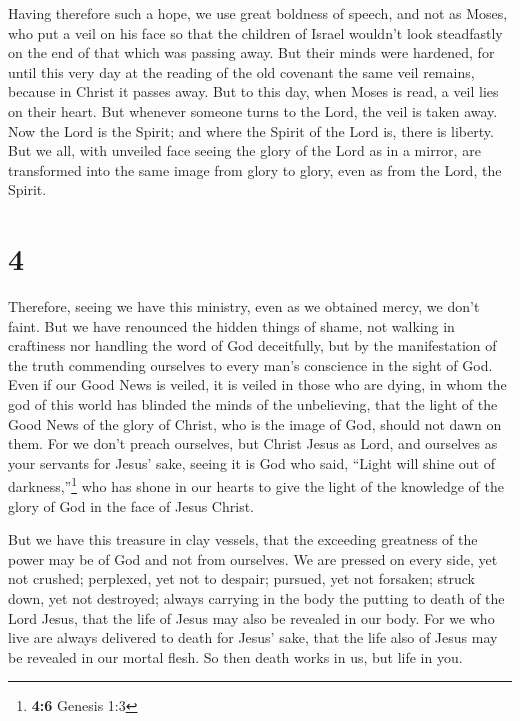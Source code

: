  Having therefore such a hope, we use great boldness of
speech,  and not as Moses, who put a veil on his face so
that the children of Israel wouldn't look steadfastly on the end of that
which was passing away.  But their minds were hardened,
for until this very day at the reading of the old covenant the same veil
remains, because in Christ it passes away.  But to this
day, when Moses is read, a veil lies on their heart.  But
whenever someone turns to the Lord, the veil is taken away.
 Now the Lord is the Spirit; and where the Spirit of the
Lord is, there is liberty.  But we all, with unveiled
face seeing the glory of the Lord as in a mirror, are transformed into
the same image from glory to glory, even as from the Lord, the Spirit.

\hypertarget{section-3}{%
\section{4}\label{section-3}}

 Therefore, seeing we have this ministry, even as we
obtained mercy, we don't faint.  But we have renounced the
hidden things of shame, not walking in craftiness nor handling the word
of God deceitfully, but by the manifestation of the truth commending
ourselves to every man's conscience in the sight of God. 
Even if our Good News is veiled, it is veiled in those who are dying,
 in whom the god of this world has blinded the minds of
the unbelieving, that the light of the Good News of the glory of Christ,
who is the image of God, should not dawn on them.  For we
don't preach ourselves, but Christ Jesus as Lord, and ourselves as your
servants for Jesus' sake,  seeing it is God who said,
``Light will shine out of darkness,''\footnote{\textbf{4:6} Genesis 1:3}
who has shone in our hearts to give the light of the knowledge of the
glory of God in the face of Jesus Christ.

 But we have this treasure in clay vessels, that the
exceeding greatness of the power may be of God and not from ourselves.
 We are pressed on every side, yet not crushed; perplexed,
yet not to despair;  pursued, yet not forsaken; struck
down, yet not destroyed;  always carrying in the body the
putting to death of the Lord Jesus, that the life of Jesus may also be
revealed in our body.  For we who live are always
delivered to death for Jesus' sake, that the life also of Jesus may be
revealed in our mortal flesh.  So then death works in us,
but life in you.

